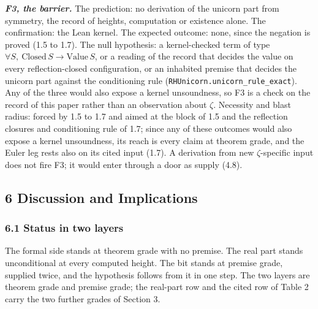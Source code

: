\documentclass[10pt]{article}
\begin{document}
\textbf{\emph{F3, the barrier.}} The prediction: no derivation of the
unicorn part from symmetry, the record of heights, computation or
existence alone. The confirmation: the Lean kernel. The expected
outcome: none, since the negation is proved (1.5 to 1.7). The null
hypothesis: a kernel-checked term of type
\(\forall S,\ \mathrm{Closed}\,S \to \mathrm{Value}\,S\), or a reading
of the record that decides the value on every reflection-closed
configuration, or an inhabited premise that decides the unicorn part
against the conditioning rule
(\texttt{RHUnicorn.\allowbreak{}unicorn\_\allowbreak{}rule\_\allowbreak{}exact}).
Any of the three would also expose a kernel unsoundness, so F3 is a
check on the record of this paper rather than an observation about
\(\zeta\). Necessity and blast radius: forced by 1.5 to 1.7 and aimed at
the block of 1.5 and the reflection closures and conditioning rule of
1.7; since any of these outcomes would also expose a kernel unsoundness,
its reach is every claim at theorem grade, and the Euler leg rests also
on its cited input (1.7). A derivation from new \(\zeta\)-specific input
does not fire F3; it would enter through a door as supply (4.8).

\hypertarget{discussion-and-implications}{%
\subsection{6 Discussion and
Implications}\label{discussion-and-implications}}

\hypertarget{status-in-two-layers}{%
\subsubsection{6.1 Status in two layers}\label{status-in-two-layers}}

The formal side stands at theorem grade with no premise. The real part
stands unconditional at every computed height. The bit stands at premise
grade, supplied twice, and the hypothesis follows from it in one step.
The two layers are theorem grade and premise grade; the real-part row
and the cited row of Table 2 carry the two further grades of Section 3.
\end{document}
